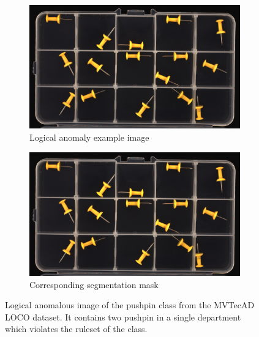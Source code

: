 \begin{figure}[htbp]
    \captionsetup[subfigure]{justification=centering}
    \centering
    \begin{subfigure}[b]{0.3\textwidth} %
        \centering
        \includegraphics[width=\textwidth]{figures/pushpinviz/image_000.png}
        \caption{Logical anomaly example image}
    \end{subfigure}
    \hspace{0.05\textwidth} %
    \begin{subfigure}[b]{0.3\textwidth} %
        \centering
        \includegraphics[width=\textwidth]{figures/pushpinviz/image_000.png}
        \caption{Corresponding segmentation mask}
    \end{subfigure}
    
    \caption{Logical anomalous image of the pushpin class from the MVTecAD LOCO \cite{LOCODentsAndScratchesBergmann2022} dataset. 
            It contains two pushpin in a single department which violates the ruleset of the class.}
    \label{fig:pushpinviz}
\end{figure}